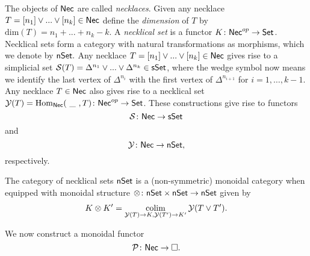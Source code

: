 The objects of $\mathsf{Nec}$ are called \textit{necklaces}. Given any necklace $T=[n_1] \vee ... \vee[n_k] \in \mathsf{Nec}$ define the \textit{dimension} of $T$ by $\text{dim}(T)=n_1+ ...+n_k-k$. A \textit{necklical set} is a functor $K \colon \mathsf{Nec}^{op} \to \mathsf{Set}$. Necklical sets form a category with natural transformations as morphisms, which we denote by $\mathsf{nSet}.$ Any necklace $T=[n_1] \vee ... \vee[n_k] \in \mathsf{Nec}$ gives rise to a simplicial set $\mathcal{S}(T)= \Delta^{n_1} \vee... \vee \Delta^{n_k} \in \mathsf{sSet}$, where the wedge symbol now means we identify the last vertex of $\Delta^{n_i}$ with the first vertex of $\Delta^{n_{i+1}}$ for $i=1,\dots,k-1$. Any necklace $T \in \mathsf{Nec}$ also gives rise to a necklical set $\mathcal{Y}(T)=\mathrm{Hom}_{\mathsf{Nec}}(\text{ \_ }, T) \colon \mathsf{Nec}^{op} \to \mathsf{Set}$. These constructions give rise to functors 
$$\mathcal{S} \colon \mathsf{Nec} \to \mathsf{sSet}$$
and
$$\mathcal{Y} \colon \mathsf{Nec} \to \mathsf{nSet},$$ respectively. 

The category of necklical sets $\mathsf{nSet}$ is a (non-symmetric) monoidal category when equipped with monoidal structure $\otimes\colon \mathsf{nSet} \times \mathsf{nSet} \to \mathsf{nSet}$ given by $$K \otimes K' = \operatorname*{colim}_{\mathcal{Y}(T) \to K, \mathcal{Y}(T')\to K'} \mathcal{Y}(T \vee T').$$

We now construct a monoidal functor
$$\mathcal{P} \colon \mathsf{Nec} \to \square.$$

